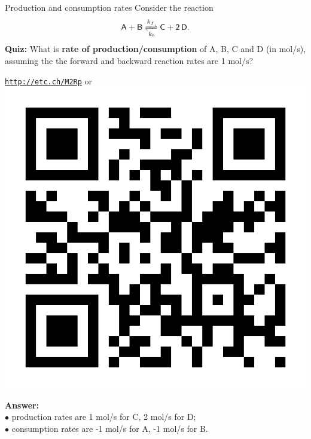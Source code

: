 \begin{frame}{Production and consumption rates}
	\vskip 10pt
Consider the reaction
	\[
	\mathsf{A+B\xrightleftharpoons[k_b]{k_f} C+2\,D.}
	\]
%
\alert{\textbf{Quiz:}} What is \textbf{rate of production\slash consumption}
of A, B, C and D (in mol/s), assuming the the forward and backward reaction rates are 1 mol/s? \\
\begin{center}{ \href{http://etc.ch/M2Rp}{\textcolor{indigo(dye)}{\tt http://etc.ch/M2Rp}}} \quad
or \quad
\includegraphics[height=0.20\columnwidth]{figures/intro/poll.png}
\end{center}
\hiddenpause
\textbf{Answer:} \\
\qquad $\bullet$ production rates are 1 mol/s for C, 2 mol/s for D; \\
\qquad $\bullet$ consumption rates are -1 mol/s for A, -1 mol/s for B. 
\end{frame}
%
